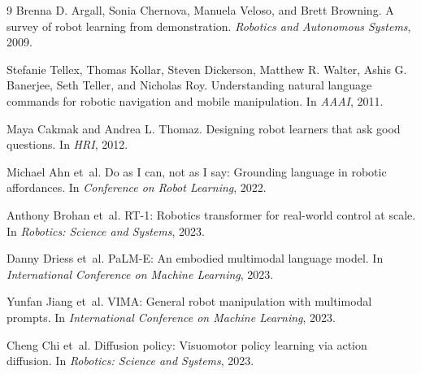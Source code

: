 \documentclass{article}
\begin{document}
\begin{thebibliography}{9}
Brenna D. Argall, Sonia Chernova, Manuela Veloso, and Brett Browning.
\newblock A survey of robot learning from demonstration.
\newblock \emph{Robotics and Autonomous Systems}, 2009.

Stefanie Tellex, Thomas Kollar, Steven Dickerson, Matthew R. Walter, Ashis G. Banerjee, Seth Teller, and Nicholas Roy.
\newblock Understanding natural language commands for robotic navigation and mobile manipulation.
\newblock In \emph{AAAI}, 2011.

Maya Cakmak and Andrea L. Thomaz.
\newblock Designing robot learners that ask good questions.
\newblock In \emph{HRI}, 2012.

Michael Ahn et~al.
\newblock Do as I can, not as I say: Grounding language in robotic affordances.
\newblock In \emph{Conference on Robot Learning}, 2022.

Anthony Brohan et~al.
\newblock RT-1: Robotics transformer for real-world control at scale.
\newblock In \emph{Robotics: Science and Systems}, 2023.

Danny Driess et~al.
\newblock PaLM-E: An embodied multimodal language model.
\newblock In \emph{International Conference on Machine Learning}, 2023.

Yunfan Jiang et~al.
\newblock VIMA: General robot manipulation with multimodal prompts.
\newblock In \emph{International Conference on Machine Learning}, 2023.

Cheng Chi et~al.
\newblock Diffusion policy: Visuomotor policy learning via action diffusion.
\newblock In \emph{Robotics: Science and Systems}, 2023.
\end{thebibliography}
\end{document}
